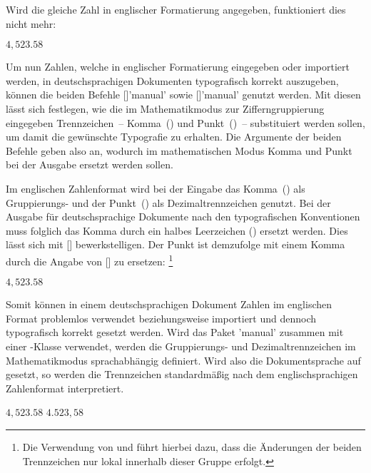 \documentclass[english,ngerman]{tudscrartcl}
\begin{document}
\begin{Entity}{}
\begin{Trunk*}
\end{Trunk*}
%
Wird die gleiche Zahl in englischer Formatierung angegeben, funktioniert dies 
nicht mehr:
%
\begin{Trunk*}
\(4,523.58\)

\end{Trunk*}
%
Um nun Zahlen, welche in englischer Formatierung eingegeben oder importiert 
werden, in deutschsprachigen Dokumenten typografisch korrekt auszugeben, können
die beiden Befehle [\PParameter{\dots}]'manual' sowie 
[\PParameter{\dots}]'manual' genutzt werden. Mit diesen lässt 
sich festlegen, wie die im Mathematikmodus zur Zifferngruppierung eingegeben 
Trennzeichen~-- Komma~(\PValue{,}) und Punkt~()~-- substituiert 
werden sollen, um damit die gewünschte Typografie zu erhalten. Die Argumente 
der beiden Befehle geben also an, wodurch im mathematischen Modus Komma und 
Punkt bei der Ausgabe ersetzt werden sollen.

Im englischen Zahlenformat wird bei der Eingabe das Komma~(\PValue{,}) als 
Gruppierungs- und der Punkt~() als Dezimaltrennzeichen genutzt. Bei 
der Ausgabe für deutschsprachige Dokumente nach den typografischen Konventionen 
muss folglich das Komma durch ein halbes Leerzeichen (\Macro*{,}) ersetzt 
werden. Dies lässt sich mit [\PParameter{\Macro*{,}}] 
bewerkstelligen. Der Punkt ist demzufolge mit einem Komma durch die Angabe von
[\PParameter{,}] zu ersetzen:%
\footnote{%
  Die Verwendung von  und  führt hierbei 
  dazu, dass die Änderungen der beiden Trennzeichen nur lokal innerhalb dieser 
  Gruppe erfolgt.
}
%
\begin{Trunk*}
\begingroup
  \commaswap{\,}
  \dotswap{,}
  \(4,523.58\)
\endgroup

\end{Trunk*}
%
Somit können in einem deutschsprachigen Dokument Zahlen im englischen Format 
problemlos verwendet beziehungsweise importiert und dennoch typografisch 
korrekt gesetzt werden.
%
%
Wird das Paket 'manual' zusammen mit einer \TUDScript-Klasse 
verwendet, werden die Gruppierungs- und Dezimaltrennzeichen im Mathematikmodus 
sprachabhängig definiert. Wird also die Dokumentsprache auf  
gesetzt, so werden die Trennzeichen standardmäßig nach dem englischsprachigen 
Zahlenformat interpretiert.
%
\begin{Trunk*}
\begingroup
  \(4,523.58\)\newline
  \(4.523,58\)
\endgroup


\end{Trunk*}
\end{Entity}
\end{document}
